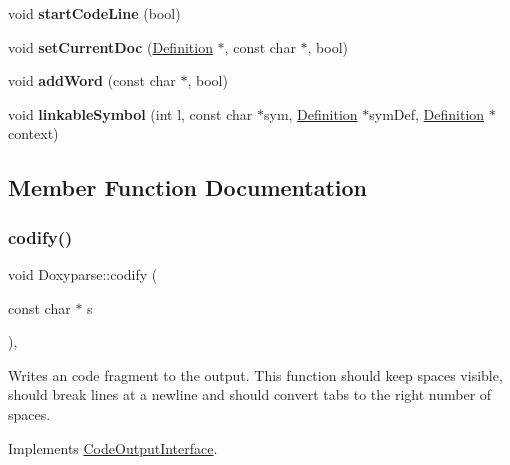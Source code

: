\begin{DoxyCompactItemize}
\mbox{\label{class_doxyparse_a8c51dc00f12e38a8b98482b72edc5cf2}} 
void {\bfseries start\+Code\+Line} (bool)
\item 
\mbox{\label{class_doxyparse_ad57714d3cc262aaf04f49c12377c6bc1}} 
void {\bfseries set\+Current\+Doc} (\mbox{\hyperlink{class_definition}{Definition}} $\ast$, const char $\ast$, bool)
\item 
\mbox{\label{class_doxyparse_a91d4f5ee82ad575d9fe311f5dbda231a}} 
void {\bfseries add\+Word} (const char $\ast$, bool)
\item 
\mbox{\label{class_doxyparse_a69339a8e5828d020624e8c0dd3f9d5fa}} 
void {\bfseries linkable\+Symbol} (int l, const char $\ast$sym, \mbox{\hyperlink{class_definition}{Definition}} $\ast$sym\+Def, \mbox{\hyperlink{class_definition}{Definition}} $\ast$context)
\end{DoxyCompactItemize}


\subsection{Member Function Documentation}
\mbox{\label{class_doxyparse_aefb4447f5ddd4f26acee9c076f826635}} 
\subsubsection{\texorpdfstring{codify()}{codify()}}
{\footnotesize\ttfamily void Doxyparse\+::codify (\begin{DoxyParamCaption}\item[{const char $\ast$}]{s }\end{DoxyParamCaption})\hspace{0.3cm}{\ttfamily [inline]}, {\ttfamily [virtual]}}

Writes an code fragment to the output. This function should keep spaces visible, should break lines at a newline and should convert tabs to the right number of spaces. 

Implements \mbox{\hyperlink{class_code_output_interface_aa29a5eedda08596ace50ed5b59c8ae7f}{Code\+Output\+Interface}}.

\mbox{\label{class_doxyparse_a57e49f80ef4f8765666507c060af4dd2}} 
